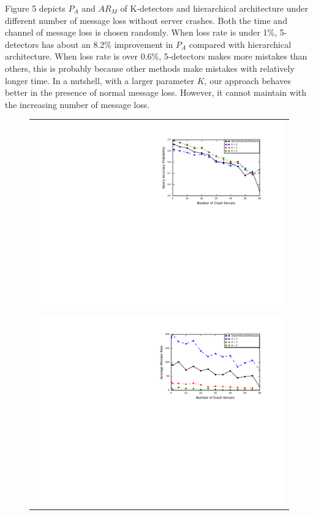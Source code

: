 \documentclass{sig-alternate-05-2015}
\begin{document}
Figure 5 depicts $P_A$ and $AR_M$ of K-detectors and hierarchical architecture under different number of message loss without server crashes. Both the time and channel of message loss is chosen randomly. When loss rate is under 1\%, 5-detectors has about an 8.2\% improvement in $P_A$ compared with hierarchical architecture. When loss rate is over 0.6\%, 5-detectors makes more mistakes than others, this is probably because other methods make mistakes with relatively longer time. In a nutshell, with a larger parameter $K$, our approach behaves better in the presence of normal message loss. However, it cannot maintain with the increasing number of message loss.

\begin{figure}
  \centering
  \begin{tabular}{c}
  \includegraphics[scale=0.7]{r3} \\
  \includegraphics[scale=0.7]{r4} \\

\end{tabular}
\end{figure}
\end{document}

